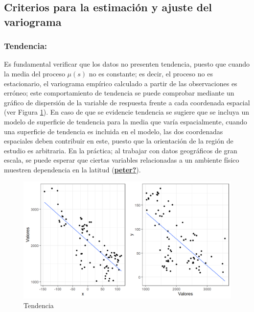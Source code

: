 \documentclass[
]{book}
\begin{document}
\hypertarget{criterios-para-la-estimaciuxf3n-y-ajuste-del-variograma}{%
\subsection{Criterios para la estimación y ajuste del variograma}\label{criterios-para-la-estimaciuxf3n-y-ajuste-del-variograma}}

\hypertarget{tendencia}{%
\subsubsection*{Tendencia:}\label{tendencia}}

Es fundamental verificar que los datos no presenten tendencia, puesto que cuando la media del proceso \(\mu(s)\) no es constante; es decir, el proceso no es estacionario, el variograma empírico calculado a partir de las observaciones es erróneo; este comportamiento de tendencia se puede comprobar mediante un gráfico de dispersión de la variable de respuesta frente a cada coordenada espacial (ver Figura \ref{fig:coordtrend}). En caso de que se evidencie tendencia se sugiere que se incluya un modelo de superficie de tendencia para la media que varía espacialmente, cuando una superficie de tendencia es incluida en el modelo, las dos coordenadas espaciales deben contribuir en este, puesto que la orientación de la región de estudio es arbitraria. En la práctica; al trabajar con datos geográficos de gran escala, se puede esperar que ciertas variables relacionadas a un ambiente físico muestren dependencia en la latitud (\protect\hyperlink{ref-peter}{\textbf{peter?}}).

\begin{figure}
\includegraphics[width=17.78in]{figuras/otros/coord_trend} \caption{Tendencia}\label{fig:coordtrend}
\end{figure}
\end{document}
